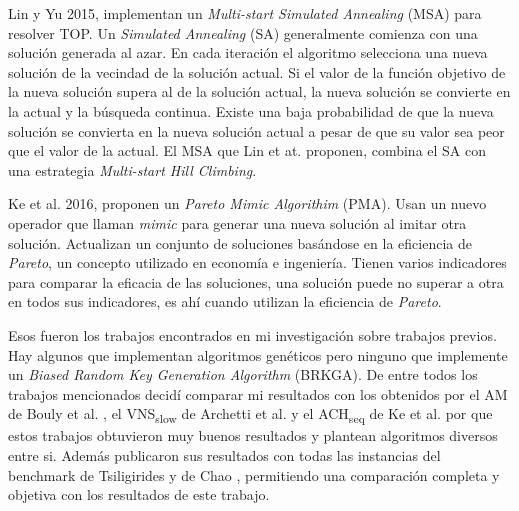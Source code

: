 \bigskip

Lin y Yu \cite{Lin} 2015, implementan un \textit{Multi-start Simulated Annealing} (MSA) para resolver TOP. Un \textit{Simulated Annealing} (SA) generalmente comienza con una solución generada al azar. En cada iteración el algoritmo selecciona una nueva solución de la vecindad de la solución actual. Si el valor de la función objetivo de la nueva solución supera al de la solución actual, la nueva solución se convierte en la actual y la búsqueda continua. Existe una baja probabilidad de que la nueva solución se convierta en la nueva solución actual a pesar de que su valor sea peor que el valor de la actual. El MSA que Lin et at. proponen, combina el SA con una estrategia \textit{Multi-start Hill Climbing}.

\bigskip

Ke et al. \cite{KZLC} 2016, proponen un \textit{Pareto Mimic Algorithim} (PMA). Usan un nuevo operador que llaman \textit{mimic} para generar una nueva solución al imitar otra solución. Actualizan un conjunto de soluciones basándose en la eficiencia de \textit{Pareto}, un concepto utilizado en economía e ingeniería. Tienen varios indicadores para comparar la eficacia de las soluciones, una solución puede no superar a otra en todos sus indicadores, es ahí cuando utilizan la eficiencia de \textit{Pareto}.

\bigskip

Esos fueron los trabajos encontrados en mi investigación sobre trabajos previos. Hay algunos que implementan algoritmos genéticos pero ninguno que implemente un \textit{Biased Random Key Generation Algorithm} (BRKGA). De entre todos los trabajos mencionados decidí comparar mi resultados con los obtenidos por el AM de Bouly et al. \cite{BoulyDangMoukrim}, el VNS\textsubscript{slow} de Archetti et al. \cite{ArchettiHertzSperanza} y el ACH\textsubscript{seq} de Ke et al. \cite{KeArchettiFeng} por que estos trabajos obtuvieron muy buenos resultados y plantean algoritmos diversos entre si. Además publicaron sus resultados con todas las instancias del benchmark de Tsiligirides y de Chao \cite{IntancesChaoTsiligirides}, permitiendo una comparación completa y objetiva con los resultados de este trabajo.









